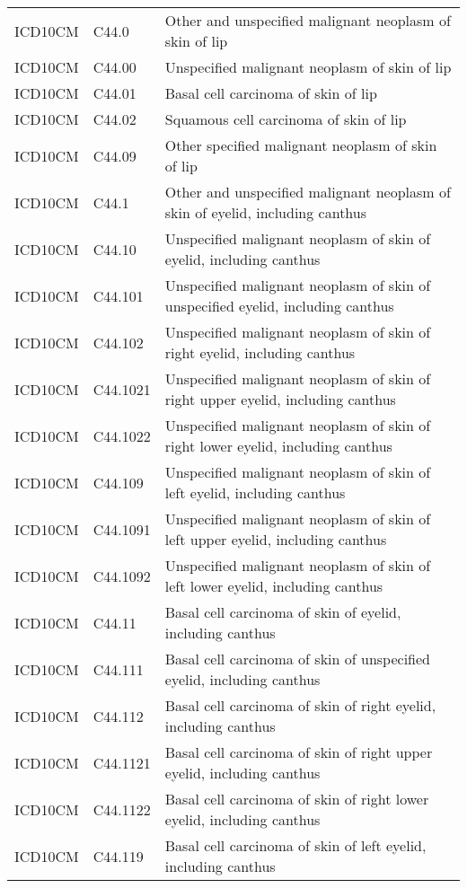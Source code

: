 \begin{longtable}{p{}p{}p{}}
  ICD10CM & C44.0 & Other and unspecified malignant neoplasm of skin of lip \\ 
  ICD10CM & C44.00 & Unspecified malignant neoplasm of skin of lip \\ 
  ICD10CM & C44.01 & Basal cell carcinoma of skin of lip \\ 
  ICD10CM & C44.02 & Squamous cell carcinoma of skin of lip \\ 
  ICD10CM & C44.09 & Other specified malignant neoplasm of skin of lip \\ 
  ICD10CM & C44.1 & Other and unspecified malignant neoplasm of skin of eyelid, including canthus \\ 
  ICD10CM & C44.10 & Unspecified malignant neoplasm of skin of eyelid, including canthus \\ 
  ICD10CM & C44.101 & Unspecified malignant neoplasm of skin of unspecified eyelid, including canthus \\ 
  ICD10CM & C44.102 & Unspecified malignant neoplasm of skin of right eyelid, including canthus \\ 
  ICD10CM & C44.1021 & Unspecified malignant neoplasm of skin of right upper eyelid, including canthus \\ 
  ICD10CM & C44.1022 & Unspecified malignant neoplasm of skin of right lower eyelid, including canthus \\ 
  ICD10CM & C44.109 & Unspecified malignant neoplasm of skin of left eyelid, including canthus \\ 
  ICD10CM & C44.1091 & Unspecified malignant neoplasm of skin of left upper eyelid, including canthus \\ 
  ICD10CM & C44.1092 & Unspecified malignant neoplasm of skin of left lower eyelid, including canthus \\ 
  ICD10CM & C44.11 & Basal cell carcinoma of skin of eyelid, including canthus \\ 
  ICD10CM & C44.111 & Basal cell carcinoma of skin of unspecified eyelid, including canthus \\ 
  ICD10CM & C44.112 & Basal cell carcinoma of skin of right eyelid, including canthus \\ 
  ICD10CM & C44.1121 & Basal cell carcinoma of skin of right upper eyelid, including canthus \\ 
  ICD10CM & C44.1122 & Basal cell carcinoma of skin of right lower eyelid, including canthus \\ 
  ICD10CM & C44.119 & Basal cell carcinoma of skin of left eyelid, including canthus \\ 

\end{longtable}
